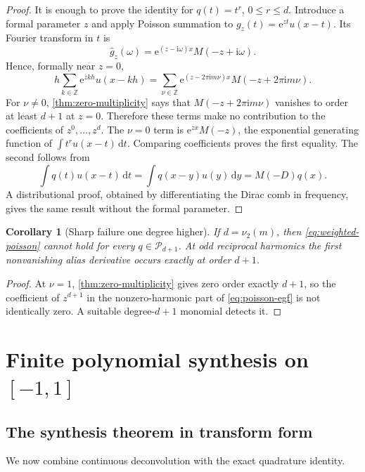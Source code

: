 \documentclass[11pt,oneside]{book}
\newtheorem{corollary}[theorem]{Corollary}
\theoremstyle{definition}
\theoremstyle{remark}
\newcommand{\Z}{\mathbb Z}
\newcommand{\Pp}{\mathcal P}
\newcommand{\vtwo}{\nu_2}
\newcommand{\dd}{\,\mathrm d}
\newcommand{\e}{\mathrm e}
\newcommand{\iu}{\mathrm i}
\begin{document}
\begin{proof}
It is enough to prove the identity for \(q(t)=t^r\), \(0\le r\le d\).  Introduce a formal parameter \(z\) and apply Poisson summation to
\(g_z(t)=\e^{zt}u(x-t)\).  Its Fourier transform in \(t\) is
\[
 \widehat g_z(\omega)
 =\e^{(z-\iu\omega)x}M(-z+\iu\omega).
\]
Hence, formally near \(z=0\),
\begin{equation}
 h\sum_{k\in\Z}\e^{zkh}u(x-kh)
 =\sum_{\nu\in\Z}
 \e^{(z-2\pi\iu m\nu)x}
 M(-z+2\pi\iu m\nu).
 \label{eq:poisson-egf}
\end{equation}
For \(\nu\ne0\), \cref{thm:zero-multiplicity} says that
\(M(-z+2\pi\iu m\nu)\) vanishes to order at least \(d+1\) at \(z=0\).  Therefore these terms make no contribution to the coefficients of \(z^0,\ldots,z^d\).  The \(\nu=0\) term is \(\e^{zx}M(-z)\), the exponential generating function of
\(\int t^r u(x-t)\dd t\).  Comparing coefficients proves the first equality.  The second follows from
\[
 \int q(t)u(x-t)\dd t
 =\int q(x-y)u(y)\dd y
 =M(-D)q(x).
\]
A distributional proof, obtained by differentiating the Dirac comb in frequency, gives the same result without the formal parameter.
\end{proof}

\begin{corollary}[Sharp failure one degree higher]
\label{cor:sharp-failure}
If \(d=\vtwo(m)\), then \cref{eq:weighted-poisson} cannot hold for every \(q\in\Pp_{d+1}\).  At odd reciprocal harmonics the first nonvanishing alias derivative occurs exactly at order \(d+1\).
\end{corollary}

\begin{proof}
At \(\nu=1\), \cref{thm:zero-multiplicity} gives zero order exactly \(d+1\), so the coefficient of \(z^{d+1}\) in the nonzero-harmonic part of \cref{eq:poisson-egf} is not identically zero.  A suitable degree-\(d+1\) monomial detects it.
\end{proof}

\chapter{Finite polynomial synthesis on \texorpdfstring{$[-1,1]$}{[-1,1]}}
\label{ch:synthesis}

\section{The synthesis theorem in transform form}
We now combine continuous deconvolution with the exact quadrature identity.
\end{document}
